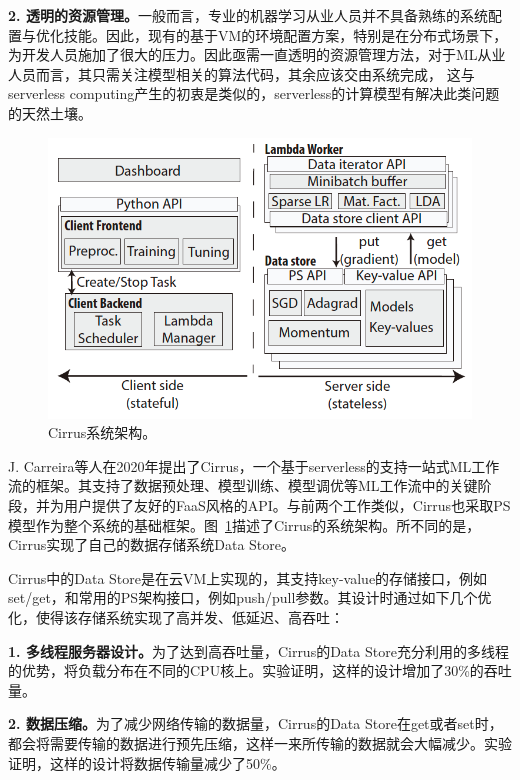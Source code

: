 \textbf{2. 透明的资源管理。}一般而言，专业的机器学习从业人员并不具备熟练的系统配置与优化技能。因此，现有的基于VM的环境配置方案，特别是在分布式场景下，为开发人员施加了很大的压力。因此亟需一直透明的资源管理方法，对于ML从业人员而言，其只需关注模型相关的算法代码，其余应该交由系统完成， 这与serverless computing产生的初衷是类似的，serverless的计算模型有解决此类问题的天然土壤。

\begin{figure}[h]
    \centerline{\includegraphics[width=\textwidth]{figures/cirrus-arch.png}}
    \caption{Cirrus系统架构。}
    \label{cirrus_arch}
\end{figure}

J. Carreira等人\parencite{carreira2019cirrus}在2020年提出了Cirrus，一个基于serverless的支持一站式ML工作流的框架。其支持了数据预处理、模型训练、模型调优等ML工作流中的关键阶段，并为用户提供了友好的FaaS风格的API。与前两个工作类似，Cirrus也采取PS模型作为整个系统的基础框架。图~\ref{cirrus_arch}描述了Cirrus的系统架构。所不同的是，Cirrus实现了自己的数据存储系统Data Store。

Cirrus中的Data Store是在云VM上实现的，其支持key-value的存储接口，例如set/get，和常用的PS架构接口，例如push/pull参数。其设计时通过如下几个优化，使得该存储系统实现了高并发、低延迟、高吞吐：

\textbf{1. 多线程服务器设计。}为了达到高吞吐量，Cirrus的Data Store充分利用的多线程的优势，将负载分布在不同的CPU核上。实验证明，这样的设计增加了30\%的吞吐量。

\textbf{2. 数据压缩。}为了减少网络传输的数据量，Cirrus的Data Store在get或者set时，都会将需要传输的数据进行预先压缩，这样一来所传输的数据就会大幅减少。实验证明，这样的设计将数据传输量减少了50\%。

